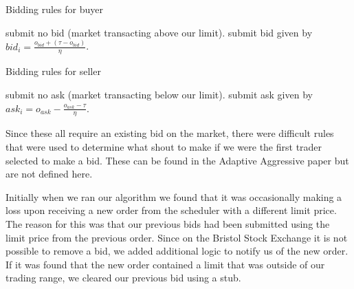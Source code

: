 \documentclass[preprint]{acm_proc_article-sp} %
\begin{document}
\begin{algorithm}[H]
    \label{alg:bidding_rules_buyer}
    \caption{Bidding rules for buyer}
    \begin{algorithmic}
            \STATE submit no bid (market transacting above our limit).
        \ELSE
            \STATE submit bid given by $bid_i = \frac{\textstyle o_{bid} + (\tau - o_{bid})}{\textstyle \eta}$.
        \ENDIF
    \end{algorithmic}
\end{algorithm}

\begin{algorithm}[H]
    \label{alg:bidding_rules_seller}
    \caption{Bidding rules for seller}
    \begin{algorithmic}
            \STATE submit no ask (market transacting below our limit).
        \ELSE
            \STATE submit ask given by $ask_i = o_{ask} - \frac{\textstyle o_{ask}-\tau}{\textstyle \eta}$.
        \ENDIF
    \end{algorithmic}
\end{algorithm}

Since these all require an existing bid on the market, there were difficult
rules that were used to determine what shout to make if we were the first
trader selected to make a bid. These can be found in the Adaptive Aggressive
paper\cite[p.~32]{AA_paper} but are not defined here.

Initially when we ran our algorithm we found that it was occasionally making a
loss upon receiving a new order from the scheduler with a different limit
price. The reason for this was that our previous bids had been submitted using
the limit price from the previous order. Since on the Bristol Stock Exchange it
is not possible to remove a bid, we added additional logic to notify us of the
new order. If it was found that the new order contained a limit that was
outside of our trading range, we cleared our previous bid using a stub.\\
\end{document}
